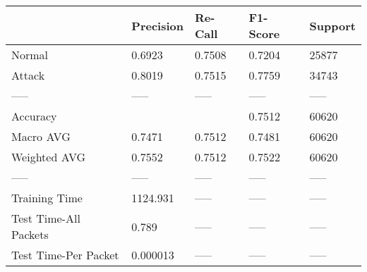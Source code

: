 \begin{tabular}{lllll}
\toprule
{} & Precision & Re-Call & F1-Score & Support \\
\midrule
Normal                &    0.6923 &  0.7508 &   0.7204 &   25877 \\
Attack                &    0.8019 &  0.7515 &   0.7759 &   34743 \\
-----                 &     ----- &   ----- &    ----- &   ----- \\
Accuracy              &           &         &   0.7512 &   60620 \\
Macro AVG             &    0.7471 &  0.7512 &   0.7481 &   60620 \\
Weighted AVG          &    0.7552 &  0.7512 &   0.7522 &   60620 \\
-----                 &     ----- &   ----- &    ----- &   ----- \\
Training Time         &  1124.931 &   ----- &    ----- &   ----- \\
Test Time-All Packets &     0.789 &   ----- &    ----- &   ----- \\
Test Time-Per Packet  &  0.000013 &   ----- &    ----- &   ----- \\
\bottomrule
\end{tabular}
